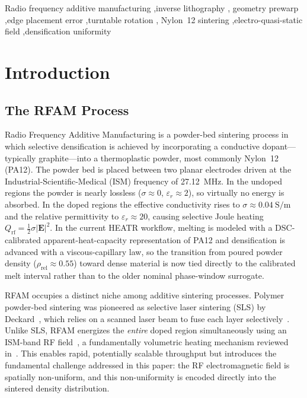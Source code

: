\documentclass[5p,times]{elsarticle}
\newcommand{\Qrf}{Q_{\mathrm{rf}}}
\newcommand{\rhorel}{\rho_{\mathrm{rel}}}
\newcommand{\vect}[1]{\boldsymbol{#1}}
\newcommand{\half}{\tfrac{1}{2}}
\begin{document}
\begin{frontmatter}
\begin{keyword}
Radio frequency additive manufacturing \sep inverse lithography \sep
geometry prewarp \sep edge placement error \sep turntable rotation \sep
Nylon~12 sintering \sep electro-quasi-static field \sep densification
uniformity
\end{keyword}

\end{frontmatter}

\section{Introduction}
\label{sec:introduction}

\subsection{The RFAM Process}

Radio Frequency Additive Manufacturing is a powder-bed sintering
process in which selective densification is achieved by incorporating
a conductive dopant---typically graphite---into a thermoplastic powder,
most commonly Nylon~12 (PA12).  The powder bed is placed between two
planar electrodes driven at the Industrial-Scientific-Medical (ISM)
frequency of \SI{27.12}{\mega\hertz}.  In the undoped regions the
powder is nearly lossless ($\sigma \approx 0$, $\varepsilon_r \approx
2$), so virtually no energy is absorbed.  In the doped regions the
effective conductivity rises to $\sigma \approx \SI{0.04}{\siemens\per\meter}$
and the relative permittivity to $\varepsilon_r \approx 20$, causing
selective Joule heating $\Qrf = \half\sigma|\vect{E}|^{2}$.  In the
current HEATR workflow, melting is modeled with a DSC-calibrated
apparent-heat-capacity representation of PA12 and densification is
advanced with a viscous-capillary law, so the transition from poured
powder density ($\rhorel \approx 0.55$) toward dense material is now
tied directly to the calibrated melt interval rather than to the older
nominal phase-window surrogate.

RFAM occupies a distinct niche among additive sintering processes.
Polymer powder-bed sintering was pioneered as selective laser sintering
(SLS) by Deckard~\cite{deckard1989method}, which relies on a scanned
laser beam to fuse each layer selectively~\cite{lupone2021process,bourell2014performance}.  Unlike SLS, RFAM energizes the \emph{entire}
doped region simultaneously using an ISM-band RF field~\cite{wroe1998rfmicrowave},
a fundamentally volumetric heating mechanism reviewed
in~\cite{Beaman2020AdditiveMR,gibson2015additive}.  This enables
rapid, potentially scalable throughput but introduces the fundamental
challenge addressed in this paper: the RF electromagnetic field is
spatially non-uniform, and this non-uniformity is encoded directly
into the sintered density distribution.
\end{document}
